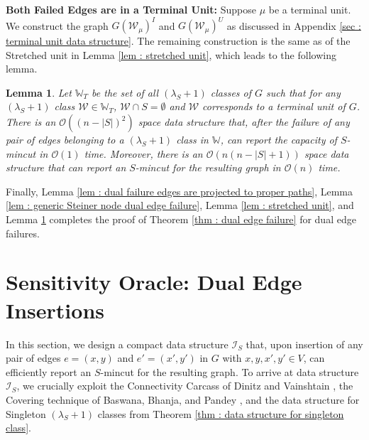 \documentclass[letterpaper,11pt]{article}
\newtheorem{lemma}{Lemma}[]
\begin{document}
\noindent
\textbf{Both Failed Edges are in a Terminal Unit:} Suppose $\mu$ be a terminal unit. We construct the graph $G({\mathcal W}_{\mu})^I$ and $G({\mathcal W}_{\mu})^U$
as discussed in Appendix \ref{sec : terminal unit data structure}. The remaining construction is the same as of the Stretched unit in Lemma \ref{lem : stretched unit}, which leads to the following lemma. \begin{lemma} \label{lem : terminal units with no steiner vertex}
     Let ${\mathbb W}_T$ be the set of all $(\lambda_S+1)$ classes of $G$ such that for any $(\lambda_S+1)$ class ${\mathcal W}\in {\mathbb W}_T$, ${\mathcal W}\cap S=\emptyset$ and ${\mathcal W}$ corresponds to a terminal unit of $G$. There is an ${\mathcal O}((n-|S|)^2)$ space data structure that, after the failure of any pair of edges belonging to a $(\lambda_S+1)$ class in ${\mathbb W}$, can report the capacity of $S$-mincut in ${\mathcal O}(1)$ time. Moreover, there is an ${\mathcal O}(n(n-|S|+1))$ space data structure that can report an $S$-mincut for the resulting graph in ${\mathcal O}(n)$ time.
\end{lemma}
Finally, Lemma \ref{lem : dual failure edges are projected to proper paths}, Lemma \ref{lem : generic Steiner node dual edge failure}, Lemma \ref{lem : stretched unit}, and Lemma \ref{lem : terminal units with no steiner vertex} completes the proof of Theorem \ref{thm : dual edge failure} for dual edge failures.


\section{Sensitivity Oracle: Dual Edge Insertions} \label{app : dual edge insertion}
In this section, we design a compact data structure ${\mathcal I}_S$ that, upon insertion of any pair of edges $e=(x,y)$ and $e'=(x',y')$ in $G$ with $x,y,x',y'\in V$, can efficiently report an $S$-mincut for the resulting graph. To arrive at data structure ${\mathcal I}_S$, we crucially exploit the Connectivity Carcass of Dinitz and Vainshtain \cite{DBLP:conf/stoc/DinitzV94, DBLP:conf/soda/DinitzV95, DBLP:journals/siamcomp/DinitzV00}, the Covering technique of Baswana, Bhanja, and Pandey \cite{DBLP:journals/talg/BaswanaBP23}, and the data structure for Singleton $(\lambda_S+1)$ classes from Theorem \ref{thm : data structure for singleton class}. 
\end{document}
